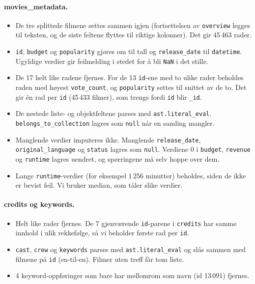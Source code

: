 \documentclass[11pt,a4paper]{article}
\begin{document}
\paragraph{movies\_metadata.}
\begin{itemize}
  \item De tre splittede filmene settes sammen igjen (fortsettelsen av \texttt{overview} legges til teksten, og de siste feltene flyttes til riktige kolonner). Det gir 45\,463 rader.
  \item \texttt{id}, \texttt{budget} og \texttt{popularity} gjøres om til tall og \texttt{release\_date} til \texttt{datetime}. Ugyldige verdier gir feilmelding i stedet for å bli \texttt{NaN} i det stille.
  \item De 17 helt like radene fjernes. For de 13 \texttt{id}-ene med to ulike rader beholdes raden med høyest \texttt{vote\_count}, og \texttt{popularity} settes til snittet av de to. Det gir én rad per \texttt{id} (45\,433 filmer), som trengs fordi \texttt{id} blir \texttt{\_id}.
  \item De nestede liste- og objektfeltene parses med \texttt{ast.literal\_eval}. \texttt{belongs\_to\_collection} lagres som \texttt{null} når en samling mangler.
  \item Manglende verdier imputeres ikke. Manglende \texttt{release\_date}, \texttt{original\_language} og \texttt{status} lagres som \texttt{null}. Verdiene 0 i \texttt{budget}, \texttt{revenue} og \texttt{runtime} lagres uendret, og spørringene må selv hoppe over dem.
  \item Lange \texttt{runtime}-verdier (for eksempel 1\,256 minutter) beholdes, siden de ikke er bevist feil. Vi bruker median, som tåler slike verdier.
\end{itemize}

\paragraph{credits og keywords.}
\begin{itemize}
  \item Helt like rader fjernes. De 7 gjenværende \texttt{id}-parene i \texttt{credits} har samme innhold i ulik rekkefølge, så vi beholder første rad per \texttt{id}.
  \item \texttt{cast}, \texttt{crew} og \texttt{keywords} parses med \texttt{ast.literal\_eval} og slås sammen med filmene på \texttt{id} (en-til-en). Filmer uten treff får tom liste.
  \item 4 keyword-oppføringer som bare har mellomrom som navn (id 13\,091) fjernes.
\end{itemize}
\end{document}
